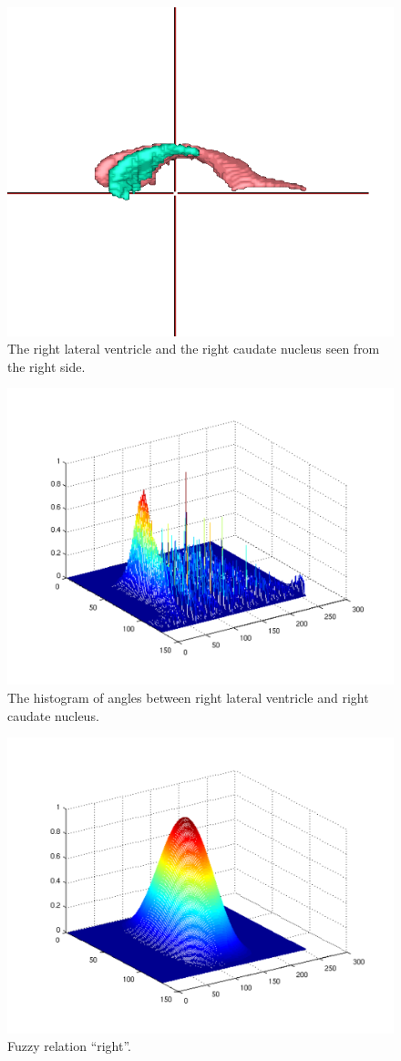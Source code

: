 \documentclass{article}
\begin{document}
\begin{figure}[h]
 \centering
 \includegraphics[width=.3\textwidth]{./figures/right_lvl_cdl.png}
 \caption{\label{fig:sturctpair}The right lateral ventricle and the right caudate nucleus seen from the right side.}
\end{figure}
\begin{figure}[h]
 \centering
 \includegraphics[width=.5\textwidth]{./figures/right_cdl_lvl_crop.pdf}
 \caption{\label{fig:histopair}The histogram of angles between right lateral ventricle and right caudate nucleus.}
\end{figure}

\begin{figure}[h]
 \centering
 \includegraphics[width=.5\textwidth]{./figures/right_crop.pdf}
 \caption{\label{fig:right}Fuzzy relation ``right''.}
\end{figure}
\end{document}
